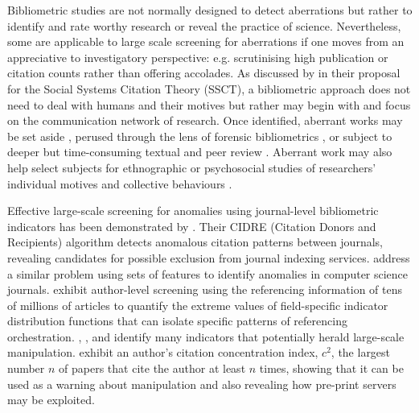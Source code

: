 \documentclass[10pt]{article}
\begin{document}
Bibliometric studies are not normally designed to detect aberrations but rather to identify and rate worthy research or reveal the practice of science. Nevertheless, some are applicable to large scale screening for aberrations if one moves from an appreciative to investigatory perspective: e.g. scrutinising high publication or citation counts rather than offering accolades. As discussed by \cite{tahamtanSocialSystemsCitation2022} in their proposal for the Social Systems Citation Theory (SSCT), a bibliometric approach does not need to deal with humans and their motives but rather may begin with and focus on the communication network of research. Once identified, aberrant works may be set aside \citep[e.g. in systematic reviews,][]{munnShouldIncludeStudies2021}, perused through the lens of forensic bibliometrics \citep{mcintoshForensicScientometricsAnEmerging2024}, or subject to deeper but time-consuming textual and peer review \citep{kilicogluBiomedicalTextMining2018}. Aberrant work may also help select subjects for ethnographic or psychosocial studies of researchers' individual motives and collective behaviours \citep{martinsonScientistsBehavingBadly2005}.

Effective large-scale screening for anomalies using journal-level bibliometric indicators has been demonstrated by \cite{kojakuDetectingAnomalousCitation2021}. Their CIDRE (Citation Donors and Recipients) algorithm detects anomalous citation patterns between journals, revealing candidates for possible exclusion from journal indexing services. \cite{chakrabortyIdentificationAnalysisCitation2020} address a similar problem using sets of features to identify anomalies in computer science journals. \cite{evdaimonMetricsDetectSmallScale2024} exhibit author-level screening using the referencing information of tens of millions of articles to quantify the extreme values of field-specific indicator distribution functions that can isolate specific patterns of referencing orchestration. \cite{ioannidisFeaturesSignalsPrecocious2024a},  \cite{ioannidisEvolvingPatternsExtreme2024a}, and \cite{ioannidisQuantitativeResearchAssessment2023a} identify many indicators that potentially herald large-scale manipulation. \cite{ibrahimCitationManipulationCitation2025} exhibit an author's citation concentration index, $c^2$, the largest number $n$ of papers that cite the author at least $n$ times, showing that it can be used as a warning about manipulation and also revealing how pre-print servers may be exploited.
\end{document}
